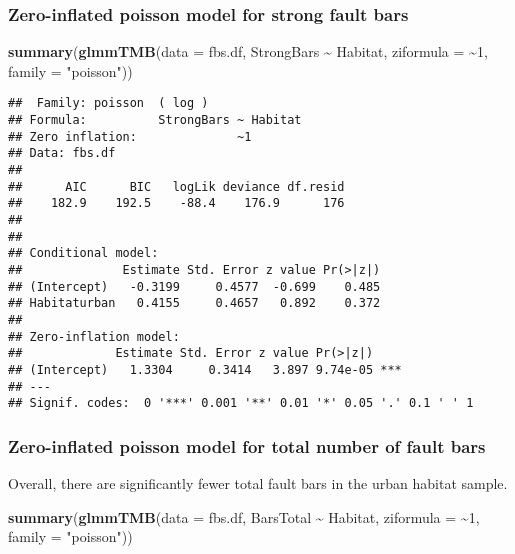 \documentclass[
]{article}
\newenvironment{Shaded}{\begin{snugshade}}{\end{snugshade}}
\newcommand{\AttributeTok}[1]{\textcolor[rgb]{0.13,0.29,0.53}{#1}}
\newcommand{\DecValTok}[1]{\textcolor[rgb]{0.00,0.00,0.81}{#1}}
\newcommand{\FunctionTok}[1]{\textcolor[rgb]{0.13,0.29,0.53}{\textbf{#1}}}
\newcommand{\NormalTok}[1]{#1}
\newcommand{\SpecialCharTok}[1]{\textcolor[rgb]{0.81,0.36,0.00}{\textbf{#1}}}
\newcommand{\StringTok}[1]{\textcolor[rgb]{0.31,0.60,0.02}{#1}}
\begin{document}
\subsubsection{Zero-inflated poisson model for strong fault
bars}\label{zero-inflated-poisson-model-for-strong-fault-bars}

\begin{Shaded}
\begin{Highlighting}[]
\FunctionTok{summary}\NormalTok{(}\FunctionTok{glmmTMB}\NormalTok{(}\AttributeTok{data =}\NormalTok{ fbs.df, StrongBars }\SpecialCharTok{\textasciitilde{}}\NormalTok{ Habitat, }\AttributeTok{ziformula =} \SpecialCharTok{\textasciitilde{}}\DecValTok{1}\NormalTok{, }\AttributeTok{family =} \StringTok{"poisson"}\NormalTok{))}
\end{Highlighting}
\end{Shaded}

\begin{verbatim}
##  Family: poisson  ( log )
## Formula:          StrongBars ~ Habitat
## Zero inflation:              ~1
## Data: fbs.df
## 
##      AIC      BIC   logLik deviance df.resid 
##    182.9    192.5    -88.4    176.9      176 
## 
## 
## Conditional model:
##              Estimate Std. Error z value Pr(>|z|)
## (Intercept)   -0.3199     0.4577  -0.699    0.485
## Habitaturban   0.4155     0.4657   0.892    0.372
## 
## Zero-inflation model:
##             Estimate Std. Error z value Pr(>|z|)    
## (Intercept)   1.3304     0.3414   3.897 9.74e-05 ***
## ---
## Signif. codes:  0 '***' 0.001 '**' 0.01 '*' 0.05 '.' 0.1 ' ' 1
\end{verbatim}

\subsubsection{Zero-inflated poisson model for total number of fault
bars}\label{zero-inflated-poisson-model-for-total-number-of-fault-bars}

Overall, there are significantly fewer total fault bars in the urban
habitat sample.

\begin{Shaded}
\begin{Highlighting}[]
\FunctionTok{summary}\NormalTok{(}\FunctionTok{glmmTMB}\NormalTok{(}\AttributeTok{data =}\NormalTok{ fbs.df, BarsTotal }\SpecialCharTok{\textasciitilde{}}\NormalTok{ Habitat, }\AttributeTok{ziformula =} \SpecialCharTok{\textasciitilde{}}\DecValTok{1}\NormalTok{, }\AttributeTok{family =} \StringTok{"poisson"}\NormalTok{))}
\end{Highlighting}
\end{Shaded}
\end{document}
